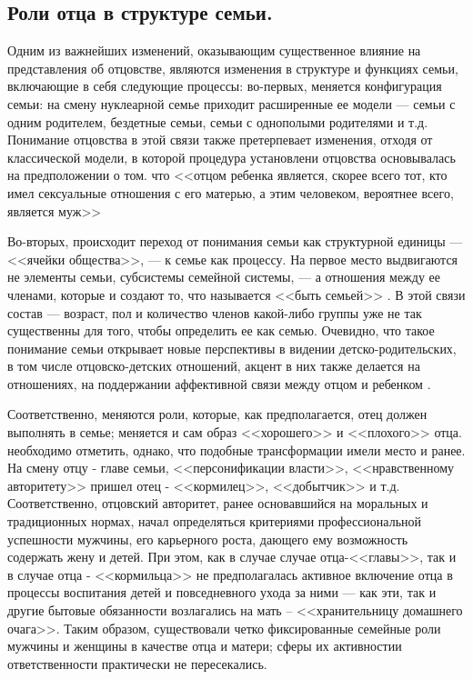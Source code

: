 \documentclass{../../common/thesisbyxetex}
\begin{document}
\subsection{Роли отца в структуре семьи.}




Одним из важнейших изменений, оказывающим существенное влияние на представления об отцовстве,
являются
изменения в структуре и функциях семьи,  включающие в себя следующие процессы:
во-первых, меняется конфигурация семьи: на смену нуклеарной семье приходит расширенные
ее модели --- семьи с одним родителем, бездетные семьи, семьи с однополыми родителями и т.д.
Понимание отцовства
в этой связи также претерпевает изменения, отходя от классической модели, в которой процедура
установлени отцовства основывалась на предположении о том. что <<отцом ребенка является, скорее
всего
 тот, кто имел сексуальные отношения с его матерью, а этим человеком, вероятнее всего,
является муж>> \cite[318]{legfat}

Во-вторых, происходит переход от понимания семьи как структурной единицы --- <<ячейки общества>>,
--- к семье как процессу. На первое место выдвигаются не элементы семьи, субсистемы семейной
системы, --- а отношения между ее членами, которые и создают то, что называется <<быть семьей>>
\cite{fam}. В этой связи состав  --- возраст, пол и количество  членов какой-либо группы уже не так
существенны для того, чтобы определить  ее как семью. Очевидно, что такое
понимание семьи открывает новые перспективы в видении детско-родительских, в том числе
отцовско-детских отношений, акцент в них также делается на отношениях, на поддержании
аффективной
связи между отцом и ребенком \cite[15]{fatpsy}.

Соответственно, меняются роли, которые, как предполагается, отец должен выполнять в семье; меняется
и сам образ <<хорошего>> и  <<плохого>> отца. необходимо отметить, однако, что подобные
трансформации имели место и ранее. На смену отцу - главе семьи, <<персонификации власти>>,
<<нравственному авторитету>> пришел отец - <<кормилец>>, <<добытчик>> и т.д. Соответственно,
отцовский авторитет, ранее основавшийся на моральных и традиционных нормах, начал определяться
критериями профессиональной успешности мужчины, его карьерного роста, дающего ему возможность
содержать жену и детей. При этом, как в случае случае отца-<<главы>>, так и в случае отца -
<<кормильца>> не предполагалась активное включение отца в процессы воспитания детей и повседневного
ухода за ними --- как эти, так и другие бытовые обязанности возлагались на мать -- <<хранительницу
домашнего очага>>. Таким образом, существовали четко фиксированные семейные роли мужчины и женщины
в качестве отца и матери; сферы их активностии ответственности практически не пересекались.
\end{document}

